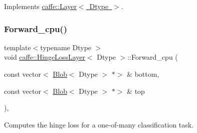 Implements \mbox{\hyperlink{classcaffe_1_1_layer_a576ac6a60b1e99fe383831f52a6cea77}{caffe\+::\+Layer$<$ Dtype $>$}}.

\mbox{\label{classcaffe_1_1_hinge_loss_layer_ab10e623d1ffbef7ba7ceeaf225bca428}} 
\subsubsection{\texorpdfstring{Forward\+\_\+cpu()}{Forward\_cpu()}\hspace{0.1cm}{\footnotesize\ttfamily [2/2]}}
{\footnotesize\ttfamily template$<$typename Dtype $>$ \\
void \mbox{\hyperlink{classcaffe_1_1_hinge_loss_layer}{caffe\+::\+Hinge\+Loss\+Layer}}$<$ Dtype $>$\+::Forward\+\_\+cpu (\begin{DoxyParamCaption}\item[{const vector$<$ \mbox{\hyperlink{classcaffe_1_1_blob}{Blob}}$<$ Dtype $>$ $\ast$$>$ \&}]{bottom,  }\item[{const vector$<$ \mbox{\hyperlink{classcaffe_1_1_blob}{Blob}}$<$ Dtype $>$ $\ast$$>$ \&}]{top }\end{DoxyParamCaption})\hspace{0.3cm}{\ttfamily [protected]}, {\ttfamily [virtual]}}



Computes the hinge loss for a one-\/of-\/many classification task. 


